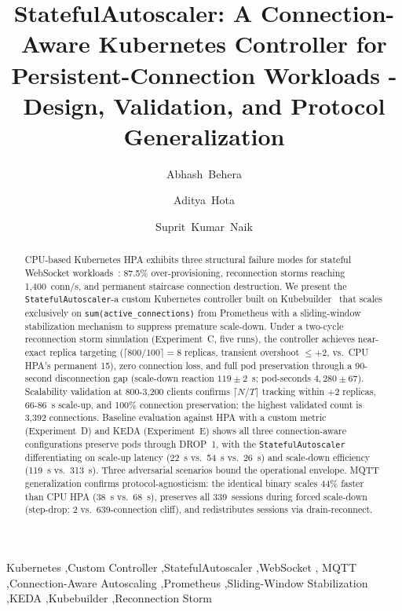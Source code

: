 \documentclass[3p,twocolumn]{elsarticle}
\theoremstyle{plain}%
\theoremstyle{definition}%
\begin{document}
\begin{frontmatter}


\title{StatefulAutoscaler: A Connection-Aware Kubernetes Controller for
Persistent-Connection Workloads - Design, Validation, and Protocol
Generalization}


\author[1]{Abhash~Behera}
\address[1]{Department of Computer Science and Engineering, C V Raman Global University, Bhubaneswar, 752054, India}

\author[1]{Aditya~Hota}

\author[1]{Suprit~Kumar~Naik}

\begin{abstract}

CPU-based Kubernetes HPA exhibits three structural failure modes for stateful WebSocket workloads~\cite{behera2026hpa}: 87.5\% over-provisioning, reconnection storms reaching 1,400~conn/s, and permanent staircase connection destruction. We present the \texttt{StatefulAutoscaler}-a custom Kubernetes controller built on Kubebuilder~\cite{kubebuilder_docs} that scales exclusively on \texttt{sum(active\_connections)} from Prometheus with a sliding-window stabilization mechanism to suppress premature scale-down. Under a two-cycle reconnection storm simulation (Experiment~C, five runs), the controller achieves near-exact replica targeting ($\lceil800/100\rceil = 8$ replicas, transient overshoot $\leq +2$, vs.\ CPU HPA's permanent 15), zero connection loss, and full pod preservation through a 90-second disconnection gap (scale-down reaction $119 \pm 2$~s; pod-seconds $4{,}280 \pm 67$). Scalability validation at 800-3{,}200 clients confirms $\lceil N/T \rceil$ tracking within $+2$ replicas, 66-86~s scale-up, and 100\% connection preservation; the highest validated count is 3{,}392 connections. Baseline evaluation against HPA with a custom metric (Experiment~D) and KEDA (Experiment~E) shows all three connection-aware configurations preserve pods through DROP~1, with the \texttt{StatefulAutoscaler} differentiating on scale-up latency (22~s vs.\ 54~s vs.\ 26~s) and scale-down efficiency (119~s vs.\ 313~s). Three adversarial scenarios bound the operational envelope. MQTT generalization confirms protocol-agnosticism: the identical binary scales 44\% faster than CPU HPA (38~s vs.\ 68~s), preserves all 339~sessions during forced scale-down (step-drop: 2 vs.\ 639-connection cliff), and redistributes sessions via drain-reconnect.

\end{abstract}
\begin{keyword}
Kubernetes \sep Custom Controller \sep StatefulAutoscaler \sep WebSocket \sep
MQTT \sep Connection-Aware Autoscaling \sep Prometheus \sep Sliding-Window
Stabilization \sep KEDA \sep Kubebuilder \sep Reconnection Storm\end{keyword}

\end{frontmatter}
\end{document}
